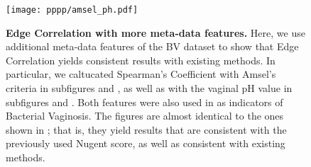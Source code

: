 
\begin{figure}[hpbt]
    \centering
    \texttt{[image: pppp/amsel\_ph.pdf]}
    \begin{subfigure}{0pt}
        \label{fig:amsel_ph:sub:amsel_em}
    \end{subfigure}
    \begin{subfigure}{0pt}
        \label{fig:amsel_ph:sub:amsel_ei}
    \end{subfigure}
    \begin{subfigure}{0pt}
        \label{fig:amsel_ph:sub:ph_em}
    \end{subfigure}
    \begin{subfigure}{0pt}
        \label{fig:amsel_ph:sub:ph_ei}
    \end{subfigure}
    \caption[Edge Correlation with more meta-data features]{
        \textbf{Edge Correlation with more meta-data features.}
        Here, we use additional meta-data features of the \ac{BV} dataset
        to show that Edge Correlation yields consistent results with existing methods.
        In particular, we caltucated Spearman's Coefficient with Amsel's criteria \cite{Amsel1983}
        in subfigures  and ,
        as well as with the vaginal pH value
        in subfigures  and .
        Both features were also used in \cite{Srinivasan2012} as indicators of Bacterial Vaginosis.
        The figures are almost identical to the ones shown in ;
        that is, they yield results that are consistent with the previously used Nugent score,
        as well as consistent with existing methods.
    }
    \label{fig:amsel_ph}
\end{figure}


